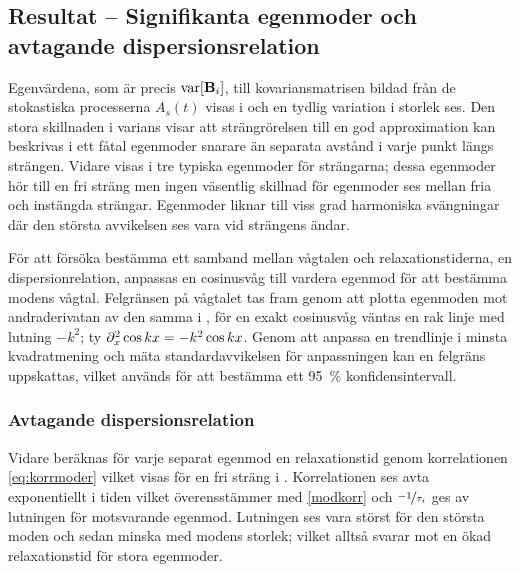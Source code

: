 \subsection{Resultat -- Signifikanta egenmoder och avtagande dispersionsrelation}

Egenvärdena, som är precis $\text{var}\!\left[\mathbf{B}_i\right]$, till kovariansmatrisen bildad från de stokastiska processerna $A_s(t)$ visas i  och en tydlig variation i storlek ses. Den stora skillnaden i varians visar att strängrörelsen till en god approximation kan beskrivas i ett fåtal egenmoder snarare än separata avstånd i varje punkt längs strängen. Vidare visas i  tre typiska egenmoder för strängarna; dessa egenmoder hör till en fri sträng men ingen väsentlig skillnad för egenmoder ses mellan fria och instängda strängar. Egenmoder liknar till viss grad harmoniska svängningar  där den största avvikelsen ses vara vid strängens ändar.



För att försöka bestämma ett samband mellan vågtalen och relaxationstiderna, en dispersionrelation, anpassas en cosinusvåg till vardera egenmod för att bestämma modens vågtal. Felgränsen på vågtalet tas fram genom att plotta egenmoden mot andraderivatan av den samma i , för en exakt cosinusvåg väntas en rak linje med lutning $-k^2$; ty $\partial_x^2\cos{kx}=-k^2\cos{kx}$. Genom att anpassa en trendlinje i minsta kvadratmening och mäta standardavvikelsen för anpassningen kan en felgräns uppskattas, vilket används för att bestämma ett 95\, \% konfidensintervall.


\subsubsection{Avtagande dispersionsrelation}
Vidare beräknas för varje separat egenmod en relaxationstid genom korrelationen \eqref{eq:korrmoder} vilket visas för en fri sträng i . Korrelationen ses avta exponentiellt i tiden vilket överensstämmer med \eqref{modkorr} och $\nicefrac{-1}{\tau_i}$ ges av lutningen för motsvarande egenmod. Lutningen ses vara störst för den största moden och sedan minska med modens storlek; vilket alltså svarar mot en ökad relaxationstid för stora egenmoder. 

